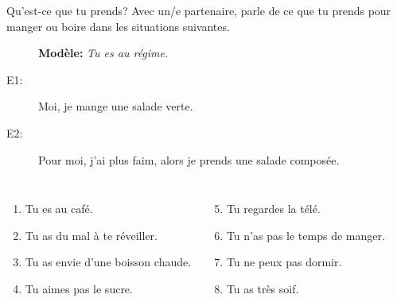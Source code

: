 \documentclass{beamer}
\begin{document}
  \begin{frame}{Qu'est-ce que tu prends?}
    Avec un/e partenaire, parle de ce que tu prends pour manger ou boire dans les situations suivantes. \\
    \begin{description}
      \item[] \textbf{Modèle:} \emph{Tu es au régime.}
      \item[E1:] Moi, je mange une salade verte.
      \item[E2:] Pour moi, j'ai plus faim, alors je prends une salade composée.
    \end{description}
    \begin{columns}[t]
        \begin{enumerate}
          \item Tu es au café.
          \item Tu as du mal à te réveiller.
          \item Tu as envie d'une boisson chaude.
          \item Tu aimes pas le sucre.
        \end{enumerate}
        \begin{enumerate}
          \setcounter{enumi}{4}
          \item Tu regardes la télé.
          \item Tu n'as pas le temps de manger.
          \item Tu ne peux pas dormir.
          \item Tu as très soif.
        \end{enumerate}
    \end{columns}
  \end{frame}
\end{document}
